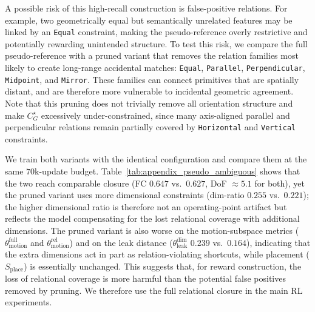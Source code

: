A possible risk of this high-recall construction is false-positive relations. For example, two geometrically equal but semantically unrelated features may be linked by an \texttt{Equal} constraint, making the pseudo-reference overly restrictive and potentially rewarding unintended structure. To test this risk, we compare the full pseudo-reference with a pruned variant that removes the relation families most likely to create long-range accidental matches: \texttt{Equal}, \texttt{Parallel}, \texttt{Perpendicular}, \texttt{Midpoint}, and \texttt{Mirror}. These families can connect primitives that are spatially distant, and are therefore more vulnerable to incidental geometric agreement.
Note that this pruning does not trivially remove all orientation structure and make $C_G^\star$ excessively under-constrained, since many axis-aligned parallel and perpendicular relations remain partially covered by \texttt{Horizontal} and \texttt{Vertical} constraints.

We train both variants with the identical configuration and compare them at the same $70$k-update budget. Table~\ref{tab:appendix_pseudo_ambiguous} shows that the two reach comparable closure (FC $0.647$ vs.\ $0.627$, DoF $\approx 5.1$ for both), yet the pruned variant uses more dimensional constraints (dim-ratio $0.255$ vs.\ $0.221$); the higher dimensional ratio is therefore not an operating-point artifact but reflects the model compensating for the lost relational coverage with additional dimensions. The pruned variant is also worse on the motion-subspace metrics ($\theta_{\mathrm{motion}}^{\mathrm{full}}$ and $\theta_{\mathrm{motion}}^{\mathrm{rel}}$) and on the leak distance ($\theta_{\mathrm{leak}}^{\mathrm{dim}}$ $0.239$ vs.\ $0.164$), indicating that the extra dimensions act in part as relation-violating shortcuts, while placement ($S_{\mathrm{place}}$) is essentially unchanged. This suggests that, for reward construction, the loss of relational coverage is more harmful than the potential false positives removed by pruning. We therefore use the full relational closure in the main RL experiments.

